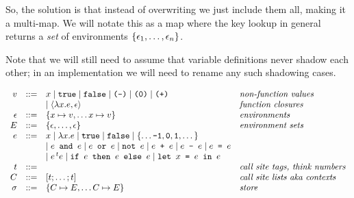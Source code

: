 So, the solution is that instead of overwriting we just include them all, making it a multi-map.  We will notate this as a map where the key lookup in general returns a \emph{set} of environments $\{\epsilon_1,\dots,\epsilon_n\}$.

Note that we will still need to assume that  variable definitions never shadow each other; in an implementation we will need to rename any such shadowing cases.

$$
\begin{array}{rcll}
v &::=& x \mid \texttt{true} \mid \texttt{false} \mid \texttt{(-)}\mid \texttt{(0)}\mid \texttt{(+)}& \textit{non-function values}\\
  &   & \mid \langle \lambda x. e, \epsilon \rangle  & \textit{function closures}\\
\epsilon &::=& \{x \mapsto v, \dots x \mapsto v \}&\textit{environments}\\
E &::=& \{\epsilon, \dots,\epsilon \}&\textit{environment sets}\\
e &::=& x \mid \lambda x. e \mid \texttt{true} \mid \texttt{false} \mid \{\dots \texttt{-1}, \texttt{0}, \texttt{1}, \dots\}\\
  &   & \mid e \texttt{ and } e \mid e \texttt{ or } e \mid \texttt{not }
        e \mid e \texttt{ + }e \mid e \texttt{ - }e \mid e \texttt{ = }e \\
& & \mid e^{\,t}e
\mid \texttt{if }e\texttt{ then }e\texttt{ else }e
\mid \texttt{let } x \texttt{ = }e\texttt{ in }e\\
t &::=& & \textit{call site tags, think numbers}\\
C &::=& [t;\ldots;t] & \textit{call site lists aka contexts}\\
\sigma &::=& \{C \mapsto E, \dots C \mapsto E\} & \textit{store}
\end{array}
$$

